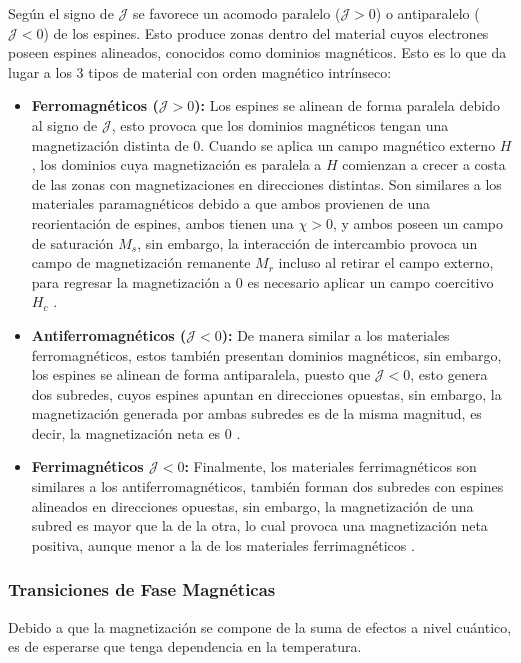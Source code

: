 \documentclass[../main.tex]{subfiles}
\begin{document}
Según el signo de $\mathcal{J}$ se favorece un acomodo paralelo ($\mathcal{J}>0$) o antiparalelo ($\mathcal{J}<0$) de los espines. Esto produce zonas dentro del material cuyos electrones poseen espines alineados, conocidos como dominios magnéticos. Esto es lo que da lugar a los 3 tipos de material con orden magnético intrínseco:
\begin{itemize}
    \item \textbf{Ferromagnéticos ($\mathcal{J}>0$):} Los espines se alinean de forma paralela debido al signo de $\mathcal{J}$, esto provoca que los dominios magnéticos tengan una magnetización distinta de 0. Cuando se aplica un campo magnético externo $H$, los dominios cuya magnetización es paralela a $H$ comienzan a crecer a costa de las zonas con magnetizaciones en direcciones distintas. Son similares a los materiales paramagnéticos debido a que ambos provienen de una reorientación de espines, ambos tienen una $\chi>0$, y ambos poseen un campo de saturación $M_s$, sin embargo, la interacción de intercambio provoca un campo de magnetización remanente $M_r$ incluso al retirar el campo externo, para regresar la magnetización a 0 es necesario aplicar un campo coercitivo $H_c$ \cite{coey2010magnetism}.
    \item \textbf{Antiferromagnéticos ($\mathcal{J}<0$):} De manera similar a los materiales ferromagnéticos, estos también presentan dominios magnéticos, sin embargo, los espines se alinean de forma antiparalela, puesto que $\mathcal{J}<0$, esto genera dos subredes, cuyos espines apuntan en direcciones opuestas, sin embargo, la magnetización generada por ambas subredes es de la misma magnitud, es decir, la magnetización neta es 0 \cite{coey2010magnetism}.
    \item \textbf{Ferrimagnéticos $\mathcal{J}<0$:} Finalmente, los materiales ferrimagnéticos son similares a los antiferromagnéticos, también forman dos subredes con espines alineados en direcciones opuestas, sin embargo, la magnetización de una subred es mayor que la de la otra, lo cual provoca una magnetización neta positiva, aunque menor a la de los materiales ferrimagnéticos \cite{coey2010magnetism}.
\end{itemize}
\subsubsection{Transiciones de Fase Magnéticas} \label{sec:magtemp}
Debido a que la magnetización se compone de la suma de efectos a nivel cuántico, es de esperarse que tenga dependencia en la temperatura.
\end{document}
